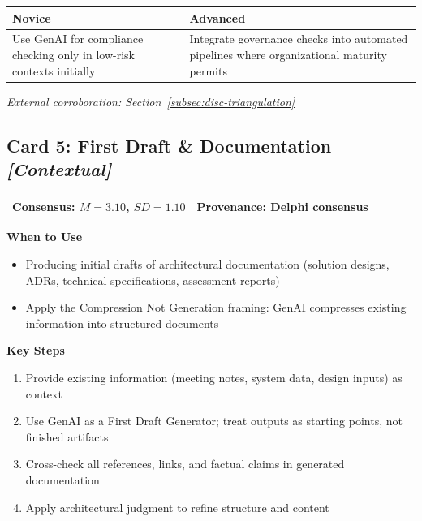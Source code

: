 \begin{tabular}{|p{6.5cm}|p{6.5cm}|}
    \hline
    \textbf{Novice} & \textbf{Advanced} \\
    \hline
    Use GenAI for compliance checking only in low-risk contexts initially & Integrate governance checks into automated pipelines where organizational maturity permits \\
    \hline
\end{tabular}

\vspace{0.5em}
\textit{External corroboration: Section~\ref{subsec:disc-triangulation}}

\clearpage
\subsection*{Card 5: First Draft \& Documentation \hfill \textit{[Contextual]}}

\begin{tabular}{|p{7cm}|p{6cm}|}
    \hline
    \textbf{Consensus:} $M = 3.10$, $SD = 1.10$ & \textbf{Provenance:} Delphi consensus \\
    \hline
\end{tabular}

\vspace{0.5em}
\textbf{When to Use}
\begin{itemize}
    \item Producing initial drafts of architectural documentation (solution designs, ADRs, technical specifications, assessment reports)
    \item Apply the Compression Not Generation framing: GenAI compresses existing information into structured documents
\end{itemize}

\textbf{Key Steps}
\begin{enumerate}
    \item Provide existing information (meeting notes, system data, design inputs) as context
    \item Use GenAI as a First Draft Generator; treat outputs as starting points, not finished artifacts
    \item Cross-check all references, links, and factual claims in generated documentation
    \item Apply architectural judgment to refine structure and content
\end{enumerate}


